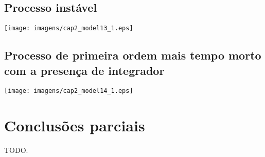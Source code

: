 \subsection{Processo instável}

    \begin{center}
        \texttt{[image: imagens/cap2\_model13\_1.eps]}
    \end{center}

\subsection{Processo de primeira ordem mais tempo morto com a presença de integrador}

    \begin{center}
        \texttt{[image: imagens/cap2\_model14\_1.eps]}
    \end{center}

\section{Conclusões parciais}

    TODO.
